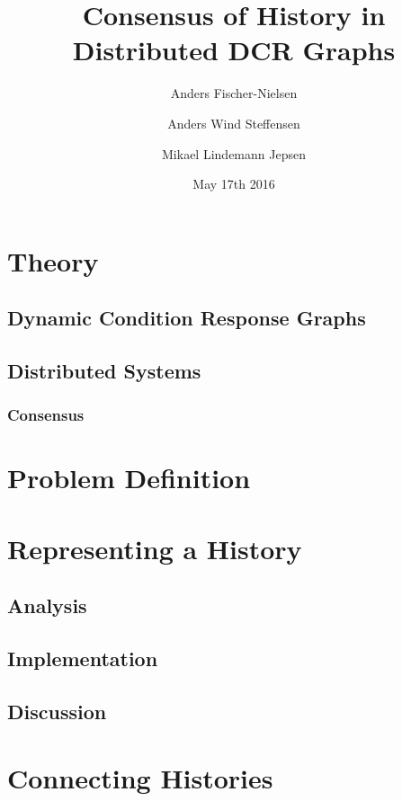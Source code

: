 \documentclass[fullpage]{report}
\title{Consensus of History in Distributed DCR Graphs}
\author{Anders Fischer-Nielsen \and Anders Wind Steffensen \and Mikael Lindemann Jepsen}
\date{May 17th 2016}
\begin{document}
	\maketitle
	\clearpage
	\tableofcontents
	\clearpage
	\chapter{Theory}
		\section{Dynamic Condition Response Graphs}
		\section{Distributed Systems}
			\subsection{Consensus}
	\chapter{Problem Definition} %
	\chapter{Representing a History}
		\section{Analysis} %
		\section{Implementation} %
		\section{Discussion} %
	\chapter{Connecting Histories} %
\end{document}
